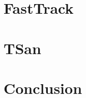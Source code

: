\documentclass[xcolor=dvipsnames]{beamer}
\begin{document}
	\section{FastTrack}
	
	\section{TSan}
	
	\section{Conclusion}
	
\end{document}

